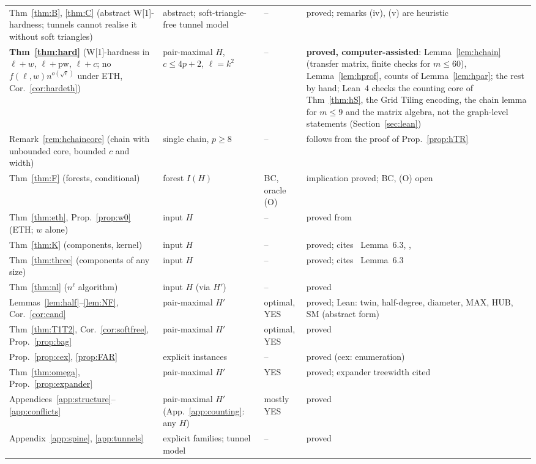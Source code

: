 {\begin{longtable}{@{}>{\raggedright\arraybackslash}p{}>{\raggedright\arraybackslash}p{}>{\raggedright\arraybackslash}p{}>{\raggedright\arraybackslash}p{}@{}}
Thm~\ref{thm:B}, \ref{thm:C} (abstract W[1]-hardness; tunnels cannot realise it without soft triangles) & abstract; soft-triangle-free tunnel model & -- & proved; remarks (iv), (v) are heuristic\\
\textbf{Thm~\ref{thm:hard}} (W[1]-hardness in $\ell+w$, $\ell+\mathrm{pw}$, $\ell+c$; no $f(\ell,w)n^{o(\sqrt\ell)}$ under ETH, Cor.~\ref{cor:hardeth}) & pair-maximal $H$, $c\le4p+2$, $\ell=k^2$ & -- & \textbf{proved, computer-assisted}: Lemma~\ref{lem:hchain} (transfer matrix, finite checks for $m\le60$), Lemma~\ref{lem:hprof}, counts of Lemma~\ref{lem:hpar}; the rest by hand; Lean~4 checks the counting core of Thm~\ref{thm:hS}, the Grid Tiling encoding, the chain lemma for $m\le9$ and the matrix algebra, not the graph-level statements (Section~\ref{sec:lean})\\
Remark~\ref{rem:hchaincore} (chain with unbounded core, bounded $c$ and width) & single chain, $p\ge8$ & -- & follows from the proof of Prop.~\ref{prop:hTR}\\
Thm~\ref{thm:F} (forests, conditional) & forest $I(H)$ & BC, oracle (O) & implication proved; BC, (O) open\\
Thm~\ref{thm:eth}, Prop.~\ref{prop:w0} (ETH; $w$ alone) & input $H$ & -- & proved from~\cite{LPS23}\\
Thm~\ref{thm:K} (components, kernel) & input $H$ & -- & proved; cites~\cite{BFK18} Lemma~6.3, \cite{Boe12}, \cite{CM12}\\
Thm~\ref{thm:three} (components of any size) & input $H$ & -- & proved; cites~\cite{BFK18} Lemma~6.3\\
Thm~\ref{thm:nl} ($n^{\ell}$ algorithm) & input $H$ (via $H'$) & -- & proved\\
Lemmas~\ref{lem:half}--\ref{lem:NF}, Cor.~\ref{cor:cand} & pair-maximal $H'$ & optimal, YES & proved; Lean: twin, half-degree, diameter, MAX, HUB, SM (abstract form)\\
Thm~\ref{thm:T1T2}, Cor.~\ref{cor:softfree}, Prop.~\ref{prop:bag} & pair-maximal $H'$ & optimal, YES & proved\\
Prop.~\ref{prop:cex}, \ref{prop:FAR} & explicit instances & -- & proved (cex: enumeration)\\
Thm~\ref{thm:omega}, Prop.~\ref{prop:expander} & pair-maximal $H'$ & YES & proved; expander treewidth cited~\cite{GM09}\\
Appendices~\ref{app:structure}--\ref{app:conflicts} & pair-maximal $H'$ (App.~\ref{app:counting}: any $H$) & mostly YES & proved\\
Appendix~\ref{app:spine}, \ref{app:tunnels} & explicit families; tunnel model & -- & proved\\

\end{longtable}}
